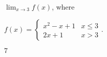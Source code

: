 {$\displaystyle \lim_{x\to 3} f(x)$, where 

$f(x) = \left\{\begin{array}{cl} x^2-x+1 & x\leq 3 \\ 2x+1 & x>3 \end{array}\right.$.}
{$7$}



